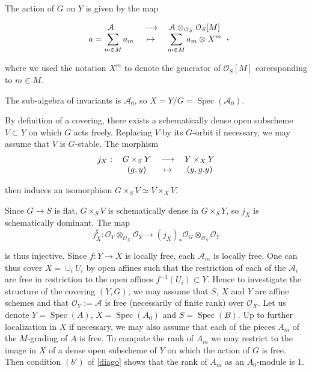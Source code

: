 \documentclass{amsart}
\theoremstyle{definition}
\theoremstyle{remark}
\begin{document}
The action of $G$ on $Y$ is given by the map 

\[\begin{tabular}{ccc}

${{\mathcal A}}$ & ${\longrightarrow}$ & ${{\mathcal A}} \otimes_{{{\mathcal O}}_S} {{\mathcal O}}_S[M]$ \\ 

$a = \displaystyle\sum_{m \in M}a_m$ & $\mapsto$ & $\displaystyle\sum_{m \in M} a_m \otimes X^m$ \\ 

\end{tabular}, \]

where we used the notation $X^m$ to denote the generator of ${{\mathcal O}}_S[M]$ coreesponding to $m \in M$.

The sub-algebra of invariants is ${{\mathcal A}}_0$, so $X = Y/G = \operatorname{Spec}({{\mathcal A}}_0)$.
  
By definition of a covering, there exists a schematically dense open subscheme $V \subset Y$ on which $G$ acts freely. Replacing $V$ by its $G$-orbit if necessary, we may assume that $V$ is $G$-stable. The morphism 
\[ \begin{tabular}{cccc}

$j_X$ :  & $G \times_S Y$ & ${\longrightarrow}$ & $Y \times_X Y$ \\ 

 & $(g,y)$ & $\mapsto$ & $(y,g.y)$ \\ 

\end{tabular}   \]

then induces an isomorphism $G \times_S V \simeq V \times_X V$. 

Since $G {\longrightarrow} S$ is flat, $G \times_S V$ is schematically dense in $G \times_S Y$, so $j_X$ is schematically dominant. The map \[ j_X^\sharp : {{\mathcal O}}_Y \otimes_{{{\mathcal O}}_X} {{\mathcal O}}_Y {\longrightarrow} (j_X)_* {{\mathcal O}}_G \otimes_{{{\mathcal O}}_S} {{\mathcal O}}_Y \]

is thus injective.
Since $f : Y {\longrightarrow} X$ is locally free, each ${{\mathcal A}}_m$ is locally free. One can thus cover $X = \cup_i U_i$ by open affines such that the restriction of each of the ${{\mathcal A}}_i$ are free in restriction to the open affines $f^{-1}(U_i) \subset Y$. 
Hence to investigate the structure of the covering $(Y,G)$, we may assume that $S$, $X$ and $Y$ are affine schemes and that ${{\mathcal O}}_Y := {{\mathcal A}}$ is free (necessarily of finite rank) over ${{\mathcal O}}_X$. Let us denote $Y = \operatorname{Spec}(A)$, $X = \operatorname{Spec}(A_0)$ and $S = \operatorname{Spec}(B)$. Up to further localization in $X$ if necessary, we may also assume that each of the pieces $A_m$ of the $M$-grading of $A$ is free. To compute the rank of $A_m$ we may restrict to the image in $X$ of a dense open subscheme of $Y$ on which the action of $G$ is free. Then condition $(b')$ of \ref{diago} shows that the rank of $A_m$ as an $A_0$-module is $1$. \label{rank}
\end{document}
